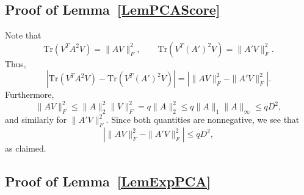 \documentclass{article}
\newcommand{\Tr}{\ensuremath{\mathrm{Tr}}}
\begin{document}
\subsection{Proof of Lemma~\ref{LemPCAScore}}
\label{AppLemPCAScore}

Note that
\begin{equation*}
\Tr(V^TA^2V) = \|AV\|_F^2, \qquad \Tr(V^T(A')^2V) = \|A'V\|_F^2.
\end{equation*}
Thus,
\begin{equation*}
|\Tr(V^TA^2V) - \Tr(V^T(A')^2V)| = \left|\|AV\|_F^2 - \|A'V\|_F^2\right|.
\end{equation*}
Furthermore,
\begin{equation*}
\|AV\|_F^2 \le \|A\|_2^2 \|V\|_F^2 = q\|A\|_2^2 \le q\|A\|_1 \|A\|_\infty \le qD^2,
\end{equation*}
and similarly for $\|A'V\|_F^2$. Since both quantities are nonnegative, we see that
\begin{equation*}
\left|\|AV\|_F^2 - \|A'V\|_F^2\right| \le qD^2,
\end{equation*}
as claimed.


\subsection{Proof of Lemma~\ref{LemExpPCA}}
\label{AppLemExpPCA}
\end{document}
